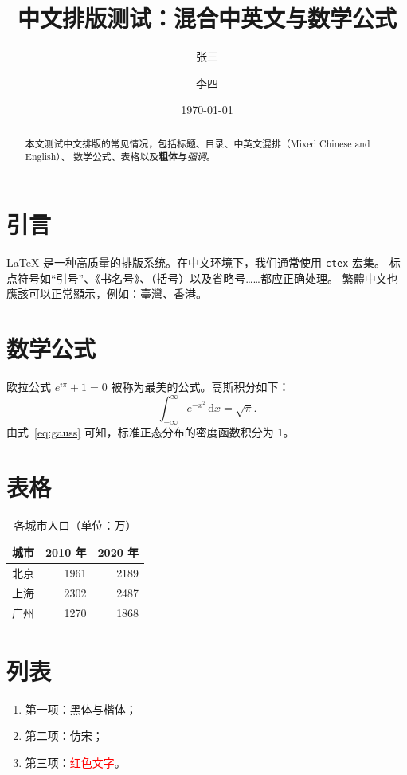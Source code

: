 \documentclass[UTF8,a4paper]{ctexart}
\title{中文排版测试：混合中英文与数学公式}
\author{张三 \and 李四}
\date{\today}
\begin{document}
\maketitle
\begin{abstract}
本文测试中文排版的常见情况，包括标题、目录、中英文混排（Mixed Chinese and English）、
数学公式、表格以及\textbf{粗体}与\emph{强调}。
\end{abstract}

\tableofcontents

\section{引言}
\LaTeX{} 是一种高质量的排版系统。在中文环境下，我们通常使用 \texttt{ctex} 宏集。
标点符号如“引号”、《书名号》、（括号）以及省略号……都应正确处理。
繁體中文也應該可以正常顯示，例如：臺灣、香港。

\section{数学公式}
欧拉公式 $e^{i\pi} + 1 = 0$ 被称为最美的公式。高斯积分如下：
\begin{equation}
  \int_{-\infty}^{\infty} e^{-x^2}\,\mathrm{d}x = \sqrt{\pi}. \label{eq:gauss}
\end{equation}
由式~\eqref{eq:gauss} 可知，标准正态分布的密度函数积分为 $1$。

\section{表格}
\begin{table}[h]
  \centering
  \caption{各城市人口（单位：万）}
  \begin{tabular}{lrr}
    \toprule
    城市 & 2010 年 & 2020 年 \\
    \midrule
    北京 & 1961 & 2189 \\
    上海 & 2302 & 2487 \\
    广州 & 1270 & 1868 \\
    \bottomrule
  \end{tabular}
\end{table}

\section{列表}
\begin{enumerate}
  \item 第一项：{\heiti 黑体}与{\kaishu 楷体}；
  \item 第二项：{\fangsong 仿宋}；
  \item 第三项：\textcolor{red}{红色文字}。
\end{enumerate}
\end{document}
